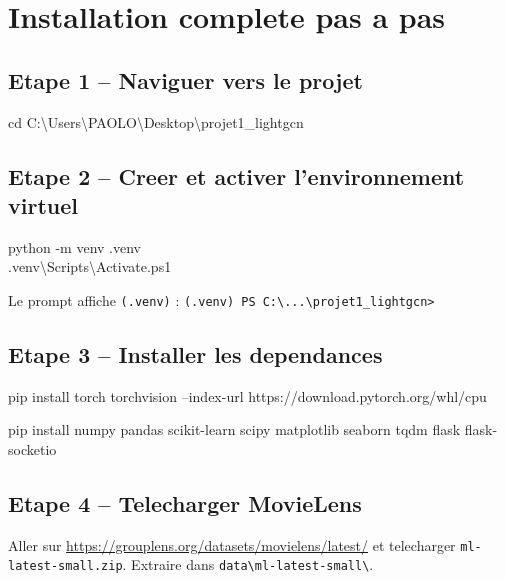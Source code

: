 \documentclass[12pt,a4paper]{report}
\begin{document}
\section{Installation complete pas a pas}

\subsection{Etape 1 -- Naviguer vers le projet}

\begin{cmdbox}
cd C:\textbackslash Users\textbackslash PAOLO\textbackslash Desktop\textbackslash projet1\_lightgcn
\end{cmdbox}

\subsection{Etape 2 -- Creer et activer l'environnement virtuel}

\begin{cmdbox}
python -m venv .venv\\
.venv\textbackslash Scripts\textbackslash Activate.ps1
\end{cmdbox}

\begin{infobox}
Le prompt affiche \texttt{(.venv)} :
\texttt{(.venv) PS C:\textbackslash...\textbackslash projet1\_lightgcn>}
\end{infobox}

\subsection{Etape 3 -- Installer les dependances}

\begin{cmdbox}
pip install torch torchvision --index-url https://download.pytorch.org/whl/cpu
\end{cmdbox}

\begin{cmdbox}
pip install numpy pandas scikit-learn scipy matplotlib seaborn tqdm flask flask-socketio
\end{cmdbox}

\subsection{Etape 4 -- Telecharger MovieLens}

Aller sur \url{https://grouplens.org/datasets/movielens/latest/}
et telecharger \texttt{ml-latest-small.zip}. Extraire dans
\texttt{data\textbackslash ml-latest-small\textbackslash}.
\end{document}
